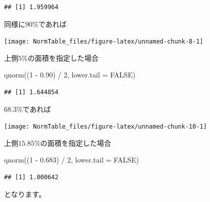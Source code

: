 \documentclass[]{tufte-handout}
\newenvironment{Shaded}{}{}
\newcommand{\AttributeTok}[1]{\textcolor[rgb]{0.49,0.56,0.16}{#1}}
\newcommand{\ConstantTok}[1]{\textcolor[rgb]{0.53,0.00,0.00}{#1}}
\newcommand{\DecValTok}[1]{\textcolor[rgb]{0.25,0.63,0.44}{#1}}
\newcommand{\FloatTok}[1]{\textcolor[rgb]{0.25,0.63,0.44}{#1}}
\newcommand{\FunctionTok}[1]{\textcolor[rgb]{0.02,0.16,0.49}{#1}}
\newcommand{\NormalTok}[1]{#1}
\newcommand{\SpecialCharTok}[1]{\textcolor[rgb]{0.25,0.44,0.63}{#1}}
\begin{document}
\begin{verbatim}
## [1] 1.959964
\end{verbatim}

同様に\(90\%\)であれば

\begin{marginfigure}

{\centering \texttt{[image: NormTable\_files/figure-latex/unnamed-chunk-8-1]} 

}

\caption[上側$5\%$の面積を指定した場合]{上側$5\%$の面積を指定した場合}\label{fig:unnamed-chunk-8}
\end{marginfigure}

\begin{Shaded}
\begin{Highlighting}[numbers=left,,]
\FunctionTok{qnorm}\NormalTok{((}\DecValTok{1} \SpecialCharTok{{-}} \FloatTok{0.90}\NormalTok{) }\SpecialCharTok{/} \DecValTok{2}\NormalTok{, }\AttributeTok{lower.tail =} \ConstantTok{FALSE}\NormalTok{)}
\end{Highlighting}
\end{Shaded}

\begin{verbatim}
## [1] 1.644854
\end{verbatim}

\(68.3\%\)であれば

\begin{marginfigure}

{\centering \texttt{[image: NormTable\_files/figure-latex/unnamed-chunk-10-1]} 

}

\caption[上側$15.85\%$の面積を指定した場合]{上側$15.85\%$の面積を指定した場合}\label{fig:unnamed-chunk-10}
\end{marginfigure}

\begin{Shaded}
\begin{Highlighting}[numbers=left,,]
\FunctionTok{qnorm}\NormalTok{((}\DecValTok{1} \SpecialCharTok{{-}} \FloatTok{0.683}\NormalTok{) }\SpecialCharTok{/} \DecValTok{2}\NormalTok{, }\AttributeTok{lower.tail =} \ConstantTok{FALSE}\NormalTok{)}
\end{Highlighting}
\end{Shaded}

\begin{verbatim}
## [1] 1.000642
\end{verbatim}

となります。
\end{document}
